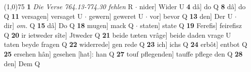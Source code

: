 \documentclass[8pt,a4paper,notitlepage]{article}
\begin{document}
\begin{table}[ht]
\begin{minipage}[t]{0.5\linewidth}
\line(1,0){75} \newline
\textbf{1} \textit{Die Verse 764.13-774.30 fehlen} R   $\cdot$ nider] Wider U \textbf{4} dâ] do Q \textbf{8} dâ] do Q \textbf{11} versagen] versaget U  $\cdot$ gewern] geweret U  $\cdot$ vor] bevor Q \textbf{13} den] Der U  $\cdot$ dir] \textit{om.} Q \textbf{15} dâ] Do Q \textbf{18} mugen] mack Q  $\cdot$ staten] state Q \textbf{19} Ferefis] feirefisz Q \textbf{20} ir ietweder sîte] Jtweder Q \textbf{21} beide tæten vrâge] beide daden vrage U taten beyde fragen Q \textbf{22} widerrede] gen rede Q \textbf{23} ich] ichs Q \textbf{24} erbôt] entbot Q \textbf{25} ersehen hân] gesehen [hat]: han Q \textbf{27} touf pflegenden] tauffe pflege den Q \textbf{28} den] Dem Q \newline
\end{minipage}
\end{table}
\end{document}
